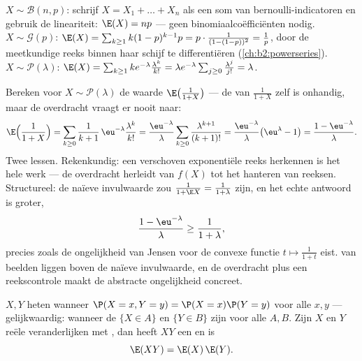 \begin{example}\label{ex:b2:randomvar:expectations}
$X \sim \mathcal{B}(n, p)$: schrijf $X = X_1 + \dots + X_n$ als een
som van bernoulli-indicatoren en gebruik de lineariteit: $\E(X) =
np$ --- geen binomiaalcoëfficiënten nodig. $X \sim
\mathcal{G}(p)$: $\E(X) = \sum_{k\geq1}k(1-p)^{k-1}p =
p\cdot\frac{1}{(1 - (1-p))^2} = \frac1p$, door de meetkundige reeks
binnen haar schijf te differentiëren (\cref{ch:b2:powerseries}). $X
\sim \mathcal{P}(\lambda)$: $\E(X) = \sum_{k\geq1}k
e^{-\lambda}\frac{\lambda^k}{k!} = \lambda
e^{-\lambda}\sum_{j\geq0}\frac{\lambda^j}{j!} = \lambda$.
\end{example}

\begin{example}\label{ex:b2:randomvar:transferex}
Bereken voor $X \sim \mathcal P(\lambda)$ de waarde
$\E\bigl(\frac1{1+X}\bigr)$ --- de  van $\frac1{1+X}$
zelf is onhandig, maar de overdracht vraagt er nooit naar:
\[
\E\Bigl(\frac1{1+X}\Bigr)
= \sum_{k\geq0}\frac{1}{k+1}\,\eu^{-\lambda}
\frac{\lambda^k}{k!}
= \frac{\eu^{-\lambda}}{\lambda}\sum_{k\geq0}
\frac{\lambda^{k+1}}{(k+1)!}
= \frac{\eu^{-\lambda}}{\lambda}\bigl(\eu^\lambda - 1\bigr)
= \frac{1 - \eu^{-\lambda}}{\lambda} .
\]
Twee lessen. Rekenkundig: een verschoven exponentiële reeks
herkennen is het hele werk --- de overdracht herleidt
 van $f(X)$ tot het hanteren van reeksen.
Structureel: de naïeve invulwaarde zou $\frac1{1 + \E X} = \frac1{1
+ \lambda}$ zijn, en het echte antwoord is groter,
\[
\frac{1 - \eu^{-\lambda}}{\lambda} \geq
\frac{1}{1 + \lambda},
\]
precies zoals de ongelijkheid van Jensen voor de convexe functie $t
\mapsto \frac1{1+t}$ eist.  van  beelden
liggen boven de naïeve invulwaarde, en de overdracht plus een
reekscontrole maakt de abstracte ongelijkheid concreet.
\end{example}

\begin{theorem}\label{thm:b2:randomvar:product}
 $X, Y$ heten \emph{} wanneer
$\P(X = x, Y = y) = \P(X = x)\P(Y = y)$ voor alle $x, y$ ---
gelijkwaardig: wanneer de  $\{X \in A\}$ en $\{Y \in
B\}$  zijn voor alle $A, B$. Zijn $X$ en $Y$
 reële veranderlijken met , dan
heeft $XY$ een  en is
\[
\E(XY) = \E(X)\,\E(Y) .
\]
\end{theorem}

